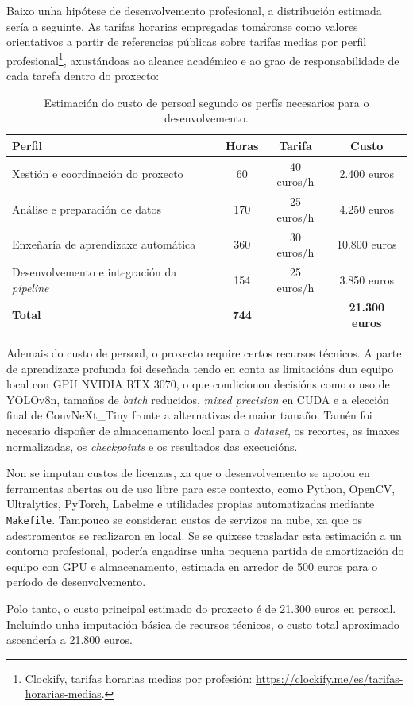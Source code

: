Baixo unha hipótese de desenvolvemento profesional, a distribución estimada sería a seguinte. As
tarifas horarias empregadas tomáronse como valores orientativos a partir de referencias públicas sobre
tarifas medias por perfil profesional\footnote{Clockify, tarifas horarias medias por profesión:
\url{https://clockify.me/es/tarifas-horarias-medias}.}, axustándoas ao alcance académico e ao grao de
responsabilidade de cada tarefa dentro do proxecto:

\begin{table}[htbp]
    \centering
    \begin{tabular}{p{}|c|c|c}
        \rowcolor{udcpink!25}
        \textbf{Perfil} & \textbf{Horas} & \textbf{Tarifa} & \textbf{Custo} \\\hline
        Xestión e coordinación do proxecto & 60 & 40 euros/h & 2.400 euros \\
        Análise e preparación de datos & 170 & 25 euros/h & 4.250 euros \\
        Enxeñaría de aprendizaxe automática & 360 & 30 euros/h & 10.800 euros \\
        Desenvolvemento e integración da \textit{pipeline} & 154 & 25 euros/h & 3.850 euros \\
        \hline
        \textbf{Total} & \textbf{744} &  & \textbf{21.300 euros} \\
    \end{tabular}
    \caption{Estimación do custo de persoal segundo os perfís necesarios para o desenvolvemento.}
    \label{tab:avaliacion-custos-persoal}
\end{table}

Ademais do custo de persoal, o proxecto require certos recursos técnicos. A parte de aprendizaxe
profunda foi deseñada tendo en conta as limitacións dun equipo local con GPU NVIDIA RTX 3070, o que
condicionou decisións como o uso de YOLOv8n, tamaños de \textit{batch} reducidos, \textit{mixed
precision} en CUDA e a elección final de ConvNeXt\_Tiny fronte a alternativas de maior tamaño. Tamén
foi necesario dispoñer de almacenamento local para o \textit{dataset}, os recortes, as imaxes
normalizadas, os \textit{checkpoints} e os resultados das execucións.

Non se imputan custos de licenzas, xa que o desenvolvemento se apoiou en ferramentas abertas ou de uso
libre para este contexto, como Python, OpenCV, Ultralytics, PyTorch, Labelme e utilidades propias
automatizadas mediante \texttt{Makefile}. Tampouco se consideran custos de servizos na nube, xa que os
adestramentos se realizaron en local. Se se quixese trasladar esta estimación a un contorno
profesional, podería engadirse unha pequena partida de amortización do equipo con GPU e almacenamento,
estimada en arredor de 500 euros para o período de desenvolvemento.

Polo tanto, o custo principal estimado do proxecto é de 21.300 euros en persoal. Incluíndo unha
imputación básica de recursos técnicos, o custo total aproximado ascendería a 21.800 euros.
